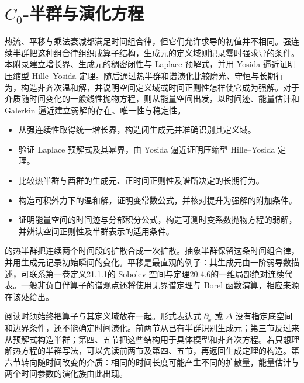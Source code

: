 \chapter{\texorpdfstring{\(C_0\)}{C₀}-半群与演化方程}
\label{b2:app:D}

\begin{chapterabstract}
热流、平移与乘法衰减都满足时间组合律，但它们允许求导的初值并不相同。强连续半群把这种组合律组织成算子结构，生成元的定义域则记录零时强求导的条件。本附录建立增长界、生成元的稠密闭性与 Laplace 预解式，并用 Yosida 逼近证明压缩型 Hille--Yosida 定理。随后通过热半群和谱演化比较磨光、守恒与长期行为，构造非齐次温和解，并说明空间定义域或时间正则性怎样使它成为强解。对于介质随时间变化的一般线性抛物方程，则从能量空间出发，以时间迹、能量估计和 Galerkin 逼近建立弱解的存在、唯一性与稳定性。
\end{chapterabstract}

\begin{learninggoals}\begin{itemize}
\item\label{b2:item:app-D-goal-1}从强连续性取得统一增长界，构造闭生成元并准确识别其定义域。
\item\label{b2:item:app-D-goal-2}验证 Laplace 预解式及其幂界，由 Yosida 逼近证明压缩型 Hille--Yosida 定理。
\item\label{b2:item:app-D-goal-3}比较热半群与酉群的生成元、正时间正则性及谱所决定的长期行为。
\item\label{b2:item:app-D-goal-4}构造可积外力下的温和解，证明变常数公式，并核对提升为强解的附加条件。
\item\label{b2:item:app-D-goal-5}证明能量空间的时间迹与分部积分公式，构造可测时变系数抛物方程的弱解，并辨认空间正则性及半群表示的适用条件。
\end{itemize}\end{learninggoals}

的热半群把连续两个时间段的扩散合成一次扩散。抽象半群保留这条时间组合律，并用生成元记录初始瞬间的变化。平移是最直观的例子：其生成元由一阶弱导数描述，可联系第一卷定义21.1.1的 Sobolev 空间与定理20.4.6的一维局部绝对连续代表。一般非负自伴算子的谱观点还将使用无界谱定理与 Borel 函数演算，相应来源在该处给出。

\ProseParagraphBreak

阅读时须始终把算子与其定义域放在一起。形式表达式 \(\partial_x\) 或 \(\Delta\) 没有指定底空间和边界条件，还不能确定时间演化。前两节从已有半群识别生成元；第三节反过来从预解式构造半群；第四、五节把这些结构用于具体模型和非齐次方程。若只想理解热方程的半群写法，可以先读前两节及第四、五节，再返回生成定理的构造。第六节转向随时间改变的介质：相同的时间长度可能产生不同的扩散量，能量估计与两个时间参数的演化族由此出现。

